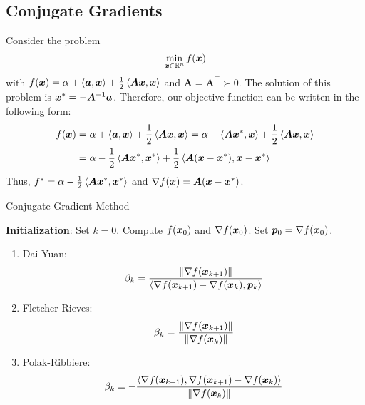 \subsection{Conjugate Gradients}\label{subsect:conj-grad}
Consider the problem
\begin{equation}\label{eq:problem-conj-grad}
    \min_{\bm{x} \in \mathbb{R}^n} f(\bm{x})
\end{equation}
with \(f(\bm{x}) = \alpha + \left\langle \bm{a}, \bm{x} \right\rangle + \frac{1}{2}\left\langle \bm{Ax}, \bm{x} \right\rangle\) and \(\bm{A} = \bm{A}^\top \succ 0\). The solution of this problem is \(\bm{x}^* = - \bm{A}^{-1}\bm{a}\).
Therefore, our objective function can be written in the following form:
\[
    \begin{aligned}
        f(\bm{x}) &= \alpha + \left\langle \bm{a}, \bm{x} \right\rangle + \frac{1}{2} \left\langle \bm{Ax}, \bm{x} \right\rangle = \alpha - \left\langle \bm{Ax}^*, \bm{x} \right\rangle + \frac{1}{2} \left\langle \bm{Ax}, \bm{x} \right\rangle \\
        &= \alpha - \frac{1}{2} \left\langle \bm{Ax}^*, \bm{x}^* \right\rangle + \frac{1}{2} \left\langle \bm{A}(\bm{x} - \bm{x}^*), \bm{x} - \bm{x}^* \right\rangle
    \end{aligned}  
\]
Thus, \(f^* = \alpha - \frac{1}{2} \left\langle \bm{Ax}^*, \bm{x}^* \right\rangle\) and \(\nabla f(\bm{x}) = \bm{A}(\bm{x} - \bm{x}^*)\).

\begin{algorithm}[!htbp]
    \caption{Conjugate Gradient Method}\label{alg:conj-grad}
    \textbf{Initialization}: Set \(k = 0\). Compute \(f(\bm{x}_0)\) and \(\nabla f(\bm{x}_0)\). Set \(\bm{p}_0 = \nabla f(\bm{x}_0)\). \\
\end{algorithm}

\begin{enumerate}
    \item Dai-Yuan: 
        \[
            \beta_k = \frac{\norm{\nabla f(\bm{x}_{k+1})}}{\left\langle \nabla f(\bm{x}_{k+1}) - \nabla f(\bm{x}_{k}), \bm{p}_k \right\rangle}  
        \]
    \item Fletcher-Rieves:
        \[
            \beta_k = \frac{\norm{\nabla f(\bm{x}_{k+1})}}{\norm{\nabla f(\bm{x}_k)}}
        \]  
    \item Polak-Ribbiere:
        \[
            \beta_k = -\frac{\left\langle \nabla f(\bm{x}_{k+1}), \nabla f(\bm{x}_{k+1}) - \nabla f(\bm{x}_{k}) \right\rangle}{\norm{\nabla f(\bm{x}_k)}}  
        \]
\end{enumerate}